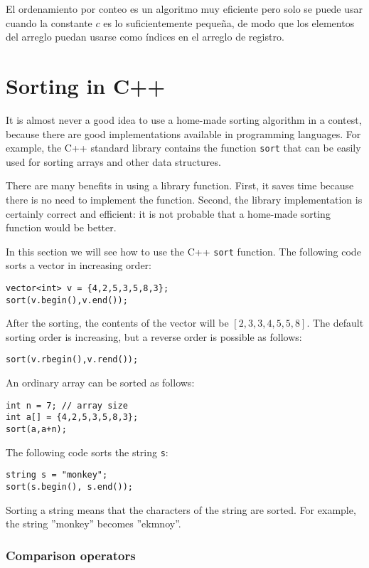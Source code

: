 El ordenamiento por conteo es un algoritmo muy eficiente
pero solo se puede usar cuando la constante $c$
es lo suficientemente pequeña, de modo que los elementos del arreglo puedan
usarse como índices en el arreglo de registro.

\section{Sorting in C++}


It is almost never a good idea to use
a home-made sorting algorithm
in a contest, because there are good
implementations available in programming languages.
For example, the C++ standard library contains
the function \texttt{sort} that can be easily used for
sorting arrays and other data structures.

There are many benefits in using a library function.
First, it saves time because there is no need to
implement the function.
Second, the library implementation is
certainly correct and efficient: it is not probable
that a home-made sorting function would be better.

In this section we will see how to use the
C++ \texttt{sort} function.
The following code sorts
a vector in increasing order:
\begin{lstlisting}
vector<int> v = {4,2,5,3,5,8,3};
sort(v.begin(),v.end());
\end{lstlisting}
After the sorting, the contents of the
vector will be
$[2,3,3,4,5,5,8]$.
The default sorting order is increasing,
but a reverse order is possible as follows:
\begin{lstlisting}
sort(v.rbegin(),v.rend());
\end{lstlisting}
An ordinary array can be sorted as follows:
\begin{lstlisting}
int n = 7; // array size
int a[] = {4,2,5,3,5,8,3};
sort(a,a+n);
\end{lstlisting}
\newpage
The following code sorts the string \texttt{s}:
\begin{lstlisting}
string s = "monkey";
sort(s.begin(), s.end());
\end{lstlisting}
Sorting a string means that the characters
of the string are sorted.
For example, the string ''monkey'' becomes ''ekmnoy''.

\subsubsection{Comparison operators}

